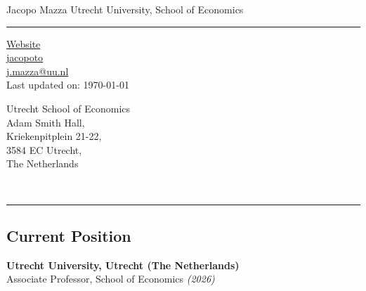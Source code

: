 \documentclass[11pt]{article}
\begin{document}
\begin{center}
\Large \sc Jacopo Mazza \hfill Utrecht University, School of Economics \\
\end{center}
\vspace{-.3cm}
\noindent\rule{\textwidth}{1pt}
\parbox[t]{.45\textwidth}{\begin{flushleft}
    \vspace{-.5cm}
    \begin{footnotesize}
    \href{https://jacopoto.github.io/}{\faGlobe\enspace Website} \\
    \href{github.com/jacopoto} {\faGithub\enspace jacopoto} \\
    \href{mailto:j.mazza@uu.nl}{\faEnvelopeO\enspace j.mazza@uu.nl} \\
    \vspace{.35cm}
    Last updated on: \today \\
    \end{footnotesize}
\end{flushleft}} \hfill
\parbox[t]{.45\textwidth}{\begin{flushright}
    \begin{footnotesize}
    \vspace{-.5cm}
    Utrecht School of Economics \\
    Adam Smith Hall, \\
    Kriekenpitplein 21-22, \\
    3584 EC Utrecht, \\
    The Netherlands \\
    \end{footnotesize}
\end{flushright}} \\
\noindent\rule{\textwidth}{1pt}

\subsection*{\sc Current Position}
\hspace{20pt}\textbf{Utrecht University, Utrecht (The Netherlands)}\\
\hspace*{27pt}Associate Professor, School of Economics \emph{(2026\textendash)}
\end{document}
